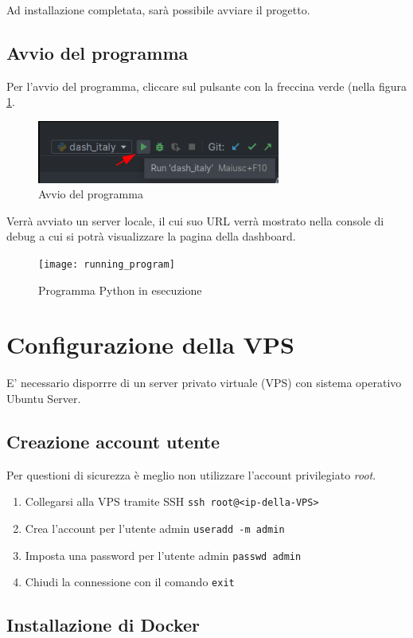Ad installazione completata, sarà possibile avviare il progetto.

\subsection{Avvio del programma}
Per l'avvio del programma, cliccare sul pulsante con la freccina verde (nella figura \ref{fig:run_dash}.
\begin{figure}[htp]
    \centering
    \includegraphics[width=8cm]{img/run_dash.png}
    \caption{Avvio del programma}
    \label{fig:run_dash}
\end{figure}
Verrà avviato un server locale, il cui suo URL verrà mostrato nella console di debug a cui si potrà visualizzare la pagina della dashboard.

 \begin{figure}[htp]
    \centering
    \texttt{[image: running\_program]}
    \caption{Programma Python in esecuzione}
    \label{fig:running_program}
\end{figure}

\section{Configurazione della VPS}
E' necessario disporrre di un server privato virtuale (VPS) con sistema operativo Ubuntu Server.

\subsection{Creazione account utente}
Per questioni di sicurezza è meglio non utilizzare l'account privilegiato \emph{root}.
\begin{enumerate}
\item Collegarsi alla VPS tramite SSH \texttt{ssh root@<ip-della-VPS>}
\item Crea l'account per l'utente admin \texttt{useradd -m admin}
\item Imposta una password per l'utente admin \texttt{passwd admin}
\item Chiudi la connessione con il comando \texttt{exit}
\end{enumerate}

\subsection{Installazione di Docker}

